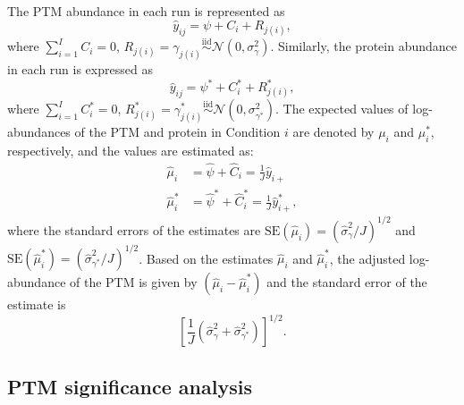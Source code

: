 \documentclass{mcp}
\begin{document}
The PTM abundance in each run is represented as 
\[
\hat{y}_{ij} = \psi + C_{i} + R_{j(i)},
\]
where $\sum_{i=1}^{I} C_{i} = 0$, $R_{j(i)} = \gamma_{j(i)} \stackrel{\text{iid}}{\sim} \mathcal{N}(0, \sigma_{\gamma}^{2})$. 
Similarly, the protein abundance in each run is expressed as
\[
\hat{y}_{ij} = \psi^{\ast} + C_{i}^{\ast} + R_{j(i)}^{\ast},
\]
where $\sum_{i=1}^{I} C_{i}^{\ast} = 0$, $R_{j(i)}^{\ast} = \gamma_{j(i)}^{\ast} \stackrel{\text{iid}}{\sim} \mathcal{N}(0, \sigma_{\gamma^{\ast}}^{2})$. The expected values of log-abundances of the PTM and protein in Condition $i$ are denoted by $\mu_{i}$ and $\mu_{i}^{\ast}$, respectively, and the values are estimated as: 
\begin{align*}
\hat{\mu}_{i} &= \hat{\psi} + \hat{C}_{i} = \frac{1}{J} \hat{y}_{i+} \\
\hat{\mu}_{i}^{\ast} &= \hat{\psi}^{\ast} + \hat{C}_{i}^{\ast} = \frac{1}{J} \hat{y}_{i+}^{\ast},
\end{align*}
where the standard errors of the estimates are $\mathrm{SE}(\hat{\mu}_{i}) = (\hat{\sigma}_{\gamma}^{2} / J)^{1/2}$ and $\mathrm{SE}(\hat{\mu}_{i}^{\ast}) = (\hat{\sigma}_{\gamma^{\ast}}^{2} / J)^{1/2}$.
Based on the estimates $\hat{\mu}_{i}$ and $\hat{\mu}_{i}^{\ast}$, the adjusted log-abundance of the PTM is given by $(\hat{\mu}_{i} - \hat{\mu}_{i}^{\ast})$ and the standard error of the estimate is 
\[
\left[ \frac{1}{J} \left( \hat{\sigma}_{\gamma}^{2} + \hat{\sigma}_{\gamma^{\ast}}^{2} \right) \right]^{1/2}.
\]


\subsection{PTM significance analysis}
\label{sec:adj}
\end{document}
